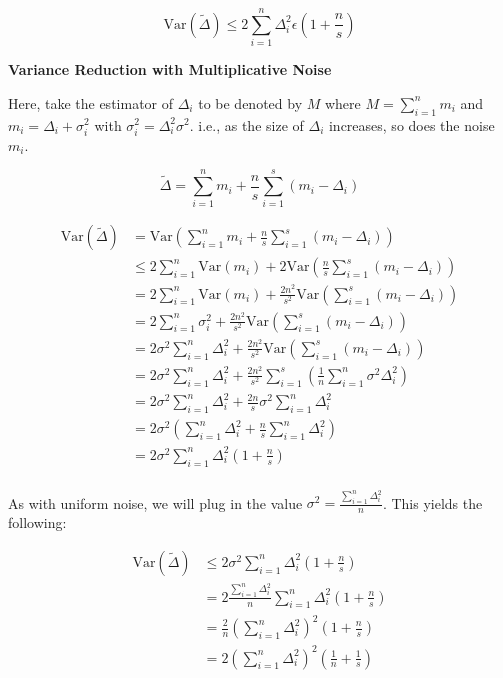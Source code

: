 \documentclass[11pt]{article}
\newcommand{\subsubsubsection}[1]{
  \vspace{1em} %
  \noindent\textbf{#1} %
  \vspace{0.5em} %
}
\begin{document}
\[
\mathrm{Var}(\tilde{\Delta}) \leq 2\sum_{i = 1}^{n}\Delta_i^2 \epsilon (1 + \frac{n}{s})
\]

\subsubsubsection{Variance Reduction with Multiplicative Noise}

Here, take the estimator of $\Delta_i$ to be denoted by $M$ where $M = \sum_{i = 1}^{n} m_i$ and $m_i = \Delta_i + \sigma_i^2$ with $\sigma_i^2 = \Delta_i^2 \sigma^2$.
i.e., as the size of $\Delta_i$ increases, so does the noise $m_i$.

\[
\tilde{\Delta} = \sum_{i = 1}^{n} m_i + \frac{n}{s} \sum_{i = 1}^{s} (m_i - \Delta_i)
\]

\[
\begin{aligned}
\mathrm{Var}(\tilde{\Delta}) &= \mathrm{Var}( \sum_{i = 1}^{n} m_i + \frac{n}{s} \sum_{i = 1}^{s} (m_i - \Delta_i)) \\
&\leq 2\sum_{i = 1}^{n} \mathrm{Var}(m_i) + 2\mathrm{Var}(\frac{n}{s} \sum_{i = 1}^{s} (m_i - \Delta_i)) \\
&= 2\sum_{i = 1}^{n} \mathrm{Var}(m_i) + \frac{2n^2}{s^2} \mathrm{Var}(\sum_{i = 1}^{s} (m_i - \Delta_i)) \\
&= 2\sum_{i = 1}^{n} \sigma_i^2 + \frac{2n^2}{s^2} \mathrm{Var}(\sum_{i = 1}^{s} (m_i - \Delta_i)) \\
&= 2\sigma^2\sum_{i = 1}^{n} \Delta_i^2 + \frac{2n^2}{s^2} \mathrm{Var}(\sum_{i = 1}^{s} (m_i - \Delta_i)) \\
&= 2\sigma^2\sum_{i = 1}^{n} \Delta_i^2 + \frac{2n^2}{s^2}\sum_{i = 1}^{s} (\frac{1}{n}\sum_{i = 1}^{n}\sigma^2\Delta_i^2) \\
&= 2\sigma^2\sum_{i = 1}^{n} \Delta_i^2 + \frac{2n}{s}\sigma^2\sum_{i = 1}^{n}\Delta_i^2 \\
&= 2\sigma^2(\sum_{i = 1}^{n} \Delta_i^2 + \frac{n}{s}\sum_{i = 1}^{n}\Delta_i^2) \\
&= 2\sigma^2\sum_{i = 1}^{n} \Delta_i^2(1 + \frac{n}{s}) \\
\end{aligned}
\]

As with uniform noise, we will plug in the value $\sigma^2 = \frac{\sum_{i = 1}^{n}\Delta_i^2}{n}$.
This yields the following:

\[
\begin{aligned}
\mathrm{Var}(\tilde{\Delta}) &\leq 2\sigma^2\sum_{i = 1}^{n} \Delta_i^2(1 + \frac{n}{s}) \\
&= 2\frac{\sum_{i = 1}^{n}\Delta_i^2}{n}\sum_{i = 1}^{n} \Delta_i^2(1 + \frac{n}{s}) \\
&= \frac{2}{n}(\sum_{i = 1}^{n}\Delta_i^2)^2(1 + \frac{n}{s}) \\
&= 2(\sum_{i = 1}^{n}\Delta_i^2)^2(\frac{1}{n} + \frac{1}{s}) \\
\end{aligned}
\]
\end{document}
